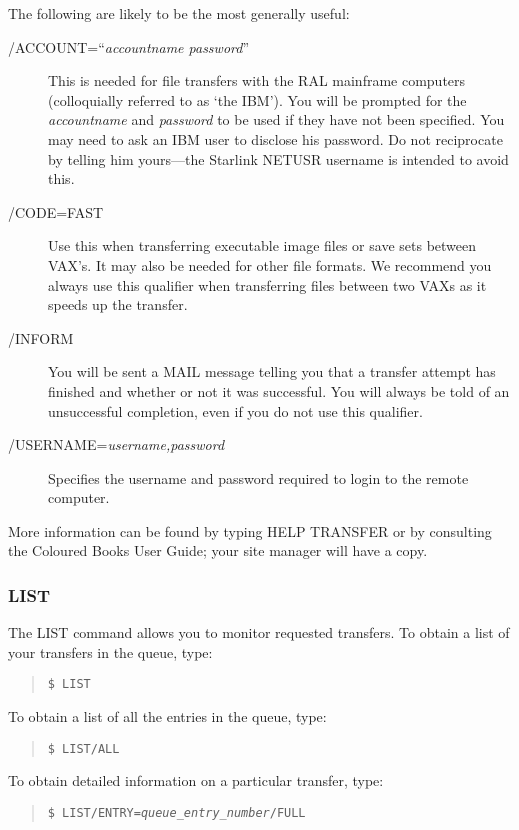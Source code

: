 The following are likely to be the most generally useful:
\begin{description}
\begin{description}
\item[/ACCOUNT=``{\em accountname password\/}'']
\hspace{5mm} This is needed for file transfers with the RAL mainframe computers
(colloquially referred to as `the IBM').
You will be prompted for the {\em accountname} and {\em password} to be used if
they have not been specified.
You may need to ask an IBM user to disclose his password.
Do not reciprocate by telling him yours---the Starlink NETUSR username is
intended to avoid this.
\item[/CODE=FAST]
\hspace{5mm} Use this when transferring executable image files or save sets
between VAX's.
It may also be needed for other file formats.
We recommend you always use this qualifier when transferring files between
two VAXs as it speeds up the transfer.
\item[/INFORM]
\hspace{5mm} You will be sent a MAIL message telling you that a transfer attempt
has finished and whether or not it was successful.
You will always be told of an unsuccessful completion, even if you do not use
this qualifier.
\item[/USERNAME={\em username,password}]
\hspace{5mm} Specifies the username and password required to login to the
remote computer.
\end{description}
\end{description}
More information can be found by typing HELP TRANSFER or by consulting the
Coloured Books User Guide; your site manager will have a copy.
\subsubsection{LIST}
The LIST command allows you to monitor requested transfers.
To obtain a list of your transfers in the queue, type:
\begin{quote}
{\tt \$ LIST}
\end{quote}
To obtain a list of all the entries in the queue, type:
\begin{quote}
{\tt \$ LIST/ALL}
\end{quote}
To obtain detailed information on a particular transfer, type:
\begin{quote}
{\tt \$ LIST/ENTRY={\em queue\_entry\_number}/FULL}
\end{quote}
